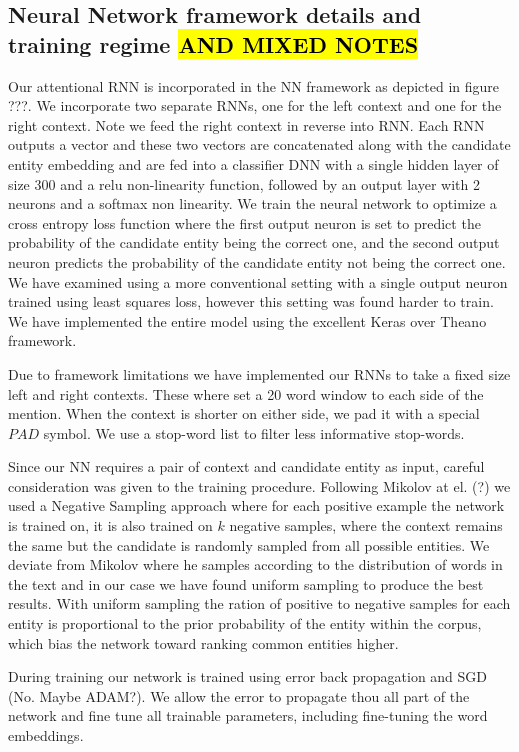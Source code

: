 \documentclass[11pt]{article}
\begin{document}
\subsection{Neural Network framework details and training regime \hl{AND MIXED NOTES}}
Our attentional RNN is incorporated in the NN framework as depicted in figure ???. We incorporate two separate RNNs, one for the left context and one for the right context. Note we feed the right context in reverse into RNN. Each RNN outputs a vector and these two vectors are concatenated along with the candidate entity embedding and are fed into a classifier DNN with a single hidden layer of size 300 and a relu non-linearity function, followed by an output layer with 2 neurons and a softmax non linearity. We train the neural network to optimize a cross entropy loss function where the first output neuron is set to predict the probability of the candidate entity being the correct one, and the second output neuron predicts the probability of the candidate entity not being the correct one. We have examined using a more conventional setting with a single output neuron trained using least squares loss, however this setting was found harder to train. We have implemented the entire model using the excellent Keras over Theano framework.

Due to framework limitations we have implemented our RNNs to take a fixed size left and right contexts. These where set a 20 word window to each side of the mention. When the context is shorter on either side, we pad it with a special $PAD$ symbol. We use a stop-word list to filter less informative stop-words.

Since our NN requires a pair of context and candidate entity as input, careful consideration was given to the training procedure. Following Mikolov at el. (?) we used a Negative Sampling approach where for each positive example the network is trained on, it is also trained on $k$ negative samples, where the context remains the same but the candidate is randomly sampled from all possible entities. We deviate from Mikolov where he samples according to the distribution of words in the text and in our case we have found uniform sampling to produce the best results. With uniform sampling the ration of positive to negative samples for each entity is proportional to the prior probability of the entity within the corpus, which bias the network toward ranking common entities higher.

During training our network is trained using error back propagation and SGD (No. Maybe ADAM?). We allow the error to propagate thou all part of the network and fine tune all trainable parameters, including fine-tuning the word embeddings.
\end{document}
